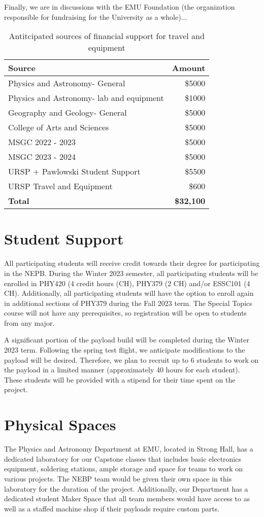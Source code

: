 \documentclass[12pt]{article}
\begin{document}
Finally, we are in discussions with the EMU Foundation (the organization responsible for
fundraising for the University as a whole)...

\begin{table}[h]
\centering
\begin{tabular}{|l|r|}
\hline
Source&Amount\\
\hline
Physics and Astronomy- General&\$5000\\
Physics and Astronomy- lab and equipment&\$1000\\
Geography and Geology- General&\$5000\\
College of Arts and Sciences&\$5000\\
MSGC 2022 - 2023&\$5000\\
MSGC 2023 - 2024&\$5000\\
URSP + Pawlowski Student Support& \$5500\\
URSP Travel and Equipment&\$600\\
\hline
{\bf Total}&{\bf \$32,100}\\
\hline
\end{tabular}
\caption{Antitcipated sources of financial support for travel and equipment}
\label{money}
\end{table}





\newpage
\section{Student Support}
All participating students will receive credit towards their degree for
participating in the NEPB. During the Winter 2023 semester, all participating students
will be enrolled in PHY420 (4 credit hours (CH), PHY379 (2 CH) and/or ESSC101 (4 CH).
Additionally, all participating students will have the option to enroll again in
additional sections of PHY379 during the Fall 2023 term. The Special Topics
course will not have any prerequisites, so registration will be open to
students from any major.

A significant portion of the payload build will be completed during the Winter 2023
term. Following the spring test flight, we anticipate modifications to the
payload will be desired. Therefore, we plan to recruit up to 6 students
to work on the payload in a limited manner (approximately 40 hours for each
student). These students will be provided with a
stipend for their time spent on the project.


\section{Physical Spaces}
The Physics and Astronomy Department at EMU, located in Strong Hall, has a dedicated laboratory for our Capstone classes that includes basic electronics equipment, soldering stations, ample storage and space for teams to work on various projects. The NEBP team would be given their own space in this laboratory for the duration of the project. Additionally, our Department has a dedicated student Maker Space that all team members would have access to as well as a staffed machine shop if their payloads require custom parts.
\end{document}
